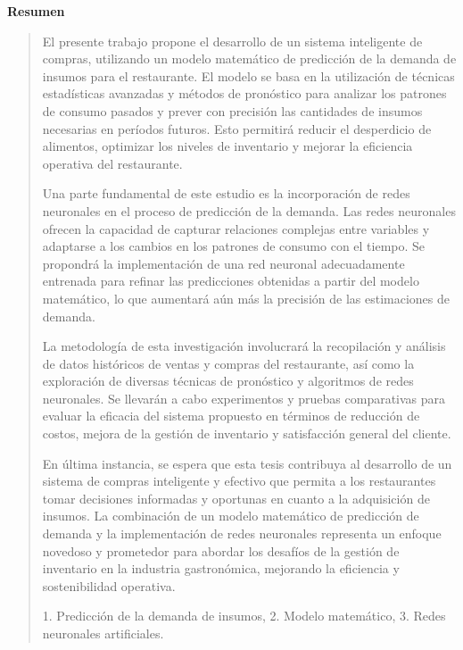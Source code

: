 \thispagestyle{empty}
\begin{center}
\begin{LARGE}
\textbf{Resumen}
\end{LARGE}
\end{center}
\begin{quotation}

    El presente trabajo propone el desarrollo de un sistema inteligente de compras, utilizando un modelo matemático de predicción de la demanda de insumos para el restaurante. El modelo se basa en la utilización de técnicas estadísticas avanzadas y métodos de pronóstico para analizar los patrones de consumo pasados y prever con precisión las cantidades de insumos necesarias en períodos futuros. Esto permitirá reducir el desperdicio de alimentos, optimizar los niveles de inventario y mejorar la eficiencia operativa del restaurante.

    Una parte fundamental de este estudio es la incorporación de redes neuronales en el proceso de predicción de la demanda. Las redes neuronales ofrecen la capacidad de capturar relaciones complejas entre variables y adaptarse a los cambios en los patrones de consumo con el tiempo. Se propondrá la implementación de una red neuronal adecuadamente entrenada para refinar las predicciones obtenidas a partir del modelo matemático, lo que aumentará aún más la precisión de las estimaciones de demanda.
    
    La metodología de esta investigación involucrará la recopilación y análisis de datos históricos de ventas y compras del restaurante, así como la exploración de diversas técnicas de pronóstico y algoritmos de redes neuronales. Se llevarán a cabo experimentos y pruebas comparativas para evaluar la eficacia del sistema propuesto en términos de reducción de costos, mejora de la gestión de inventario y satisfacción general del cliente.
    
    En última instancia, se espera que esta tesis contribuya al desarrollo de un sistema de compras inteligente y efectivo que permita a los restaurantes tomar decisiones informadas y oportunas en cuanto a la adquisición de insumos. La combinación de un modelo matemático de predicción de demanda y la implementación de redes neuronales representa un enfoque novedoso y prometedor para abordar los desafíos de la gestión de inventario en la industria gastronómica, mejorando la eficiencia y sostenibilidad operativa.
    
    
    
    
    
    
\vspace*{0.5cm}

 1. Predicción de la demanda de insumos, 2. Modelo matemático, 3. Redes neuronales artificiales.

\end{quotation}
